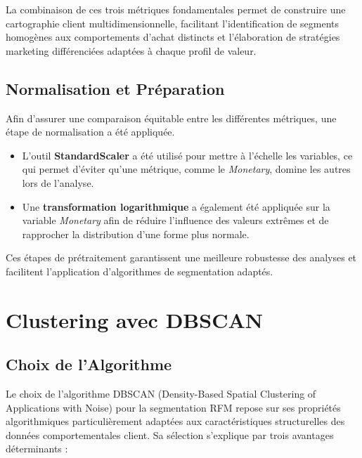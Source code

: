 \documentclass[a4paper,12pt]{article}
\begin{document}
La combinaison de ces trois métriques fondamentales permet de construire une cartographie client multidimensionnelle, facilitant l'identification de segments homogènes aux comportements d'achat distincts et l'élaboration de stratégies marketing différenciées adaptées à chaque profil de valeur.

\subsection{Normalisation et Préparation}
Afin d’assurer une comparaison équitable entre les différentes métriques, une étape de normalisation a été appliquée. 

\begin{itemize}
    \item L’outil \textbf{StandardScaler} a été utilisé pour mettre à l’échelle les variables, ce qui permet d’éviter 
    qu’une métrique, comme le \textit{Monetary}, domine les autres lors de l’analyse.
    
    \item Une \textbf{transformation logarithmique} a également été appliquée sur la variable \textit{Monetary} 
    afin de réduire l’influence des valeurs extrêmes et de rapprocher la distribution d’une forme plus normale.
\end{itemize}

Ces étapes de prétraitement garantissent une meilleure robustesse des analyses et facilitent l’application 
d’algorithmes de segmentation adaptés.
\section{Clustering avec DBSCAN}

\subsection{Choix de l'Algorithme}

Le choix de l'algorithme DBSCAN (Density-Based Spatial Clustering of Applications with Noise) pour la segmentation RFM repose sur ses propriétés algorithmiques particulièrement adaptées aux caractéristiques structurelles des données comportementales client. Sa sélection s'explique par trois avantages déterminants :
\end{document}
